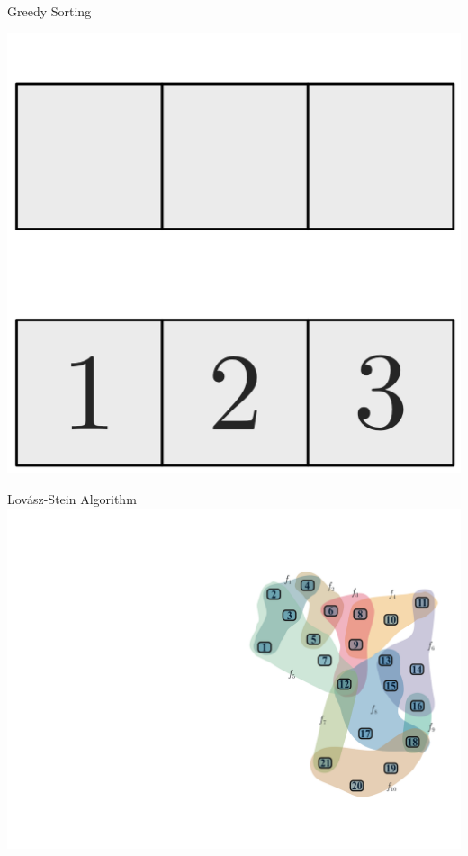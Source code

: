 \documentclass[10pt]{beamer}
\begin{document}
\begin{frame}[fragile]{Greedy Sorting}
    \begin{center}
        \includegraphics[height=.4\textheight]{Images/Bubblesort/Bubblesort_11}
    \end{center}
\end{frame}


\begin{frame}[fragile]{Lovász-Stein Algorithm}
    \vspace*{-3em}\hspace*{-2em}\includegraphics[width=1.15\textwidth]{Images/LSAExample/00}
\end{frame}
\end{document}
